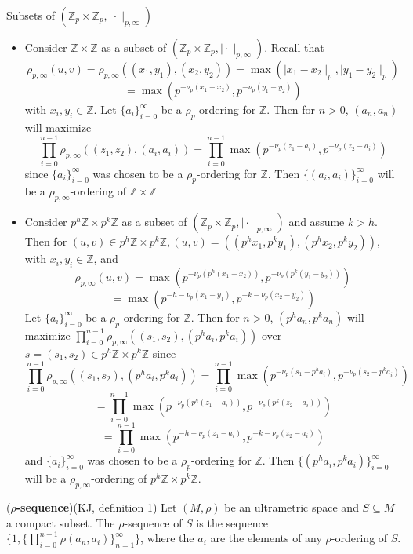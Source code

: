 \begin{example}
Subsets of $(\mathbb{Z}_p \times \mathbb{Z}_p, \mid \cdot \mid_{p, \infty})$
	\begin{itemize}
		\item 	Consider $\mathbb{Z} \times \mathbb{Z}$ as a subset of $(\mathbb{Z}_p \times \mathbb{Z}_p, \mid \cdot \mid_{p,\infty})$. Recall that \[\rho_{p,\infty}(u,v) = \rho_{p,\infty}((x_1,y_1),(x_2,y_2))= \max(\mid x_1 - x_2 \mid_p, \mid y_1 - y_2 \mid_p)\] \[= \max(p^{-\nu_p(x_1-x_2)},p^{-\nu_p(y_1-y_2) })\] with $x_i, y_i \in \mathbb{Z}$.  Let $\{a_i\}_{i=0}^{\infty}$ be a $\rho_p$-ordering for $\mathbb{Z}$. Then for $n>0$,  $(a_n, a_n)$ will maximize \[\prod_{i=0}^{n-1} \rho_{p,\infty} ((z_1, z_2), (a_i, a_i)) = \prod_{i=0}^{n-1} \max(p^{-\nu_p(z_1 - a_i)},p^{-\nu_p(z_2 - a_i)})\] since $\{a_i\}_{i=0}^{\infty}$ was chosen to be a $\rho_p$-ordering for $\mathbb{Z}$. Then $\{(a_i, a_i)\}_{i=0}^{\infty}$ will be a $\rho_{p, \infty}$-ordering of $\mathbb{Z} \times \mathbb{Z}$	
		
		
		\item 	Consider $p^h\mathbb{Z} \times p^k\mathbb{Z}$ as a subset of $(\mathbb{Z}_p \times \mathbb{Z}_p, \mid \cdot \mid_{p,\infty})$ and assume $k > h$. Then for $(u,v) \in p^h\mathbb{Z} \times p^k\mathbb{Z}, (u,v) = ((p^hx_1,p^ky_1), (p^hx_2, p^ky_2))$, with $x_i,y_i \in \mathbb{Z}$, and \[\rho_{p,\infty}(u,v) =  \max(p^{-\nu_p(p^h(x_1-x_2))},p^{-\nu_p(p^k(y_1-y_2)) })\]\[ = \max(p^{-h-\nu_p(x_1-y_1)}, p^{-k-\nu_p(x_2-y_2)})\]   Let $\{a_i\}_{i=0}^{\infty}$ be a $\rho_p$-ordering for $\mathbb{Z}$. Then for $n>0$,  $(p^ha_n, p^ka_n)$ will maximize $\prod_{i=0}^{n-1} \rho_{p,\infty} ((s_1, s_2), (p^ha_i, p^ka_i))$ over $s=(s_1,s_2) \in p^h\mathbb{Z} \times p^k\mathbb{Z}$ since \[\prod_{i=0}^{n-1} \rho_{p,\infty} ((s_1, s_2), (p^ha_i, p^ka_i)) = \prod_{i=0}^{n-1} \max(p^{-\nu_p(s_1 - p^ha_i)},p^{-\nu_p(s_2 - p^ka_i)}) \] \[ =\prod_{i=0}^{n-1} \max(p^{-\nu_p(p^h(z_1 - a_i))}, p^{-\nu_p(p^k(z_2 - a_i))})\]\[=\prod_{i=0}^{n-1} \max(p^{-h-\nu_p(z_1 - a_i)}, p^{-k-\nu_p(z_2 - a_i)})\] and $\{a_i\}_{i=0}^{\infty}$ was chosen to be a $\rho_p$-ordering for $\mathbb{Z}$. Then $\{(p^ha_i, p^ka_i)\}_{i=0}^{\infty}$ will be a $\rho_{p, \infty}$-ordering of ${p^h\mathbb{Z} \times p^k\mathbb{Z}}.$	
		
	\end{itemize}
\end{example}


\begin{definition}
	(\textbf{$\rho$-sequence})(KJ, definition 1)  Let $(M, \rho)$ be an ultrametric space and $S \subseteq M$ a compact subset. The $\rho$-sequence of $S$ is the sequence $\{1, \{\prod_{i=0}^{n-1} \rho(a_n,a_i)\}_{n=1}^{\infty}\}	$, where the $a_i$ are the elements of any $\rho$-ordering of $S$.
\end{definition}


